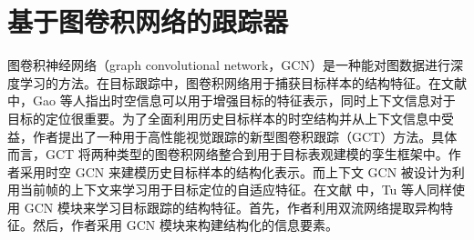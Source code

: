 \section{基于图卷积网络的跟踪器}
图卷积神经网络（graph convolutional network，GCN）是一种能对图数据进行深度学习的方法。在目标跟踪中，图卷积网络用于捕获目标样本的结构特征。在文献 \cite{gao2019graph} 中，Gao 等人指出时空信息可以用于增强目标的特征表示，同时上下文信息对于目标的定位很重要。为了全面利用历史目标样本的时空结构并从上下文信息中受益，作者提出了一种用于高性能视觉跟踪的新型图卷积跟踪（GCT）方法。具体而言，GCT 将两种类型的图卷积网络整合到用于目标表观建模的孪生框架中。作者采用时空 GCN 来建模历史目标样本的结构化表示。而上下文 GCN 被设计为利用当前帧的上下文来学习用于目标定位的自适应特征。在文献 \cite{tu2019visual} 中，Tu 等人同样使用 GCN 模块来学习目标跟踪的结构特征。首先，作者利用双流网络提取异构特征。然后，作者采用 GCN 模块来构建结构化的信息要素。

